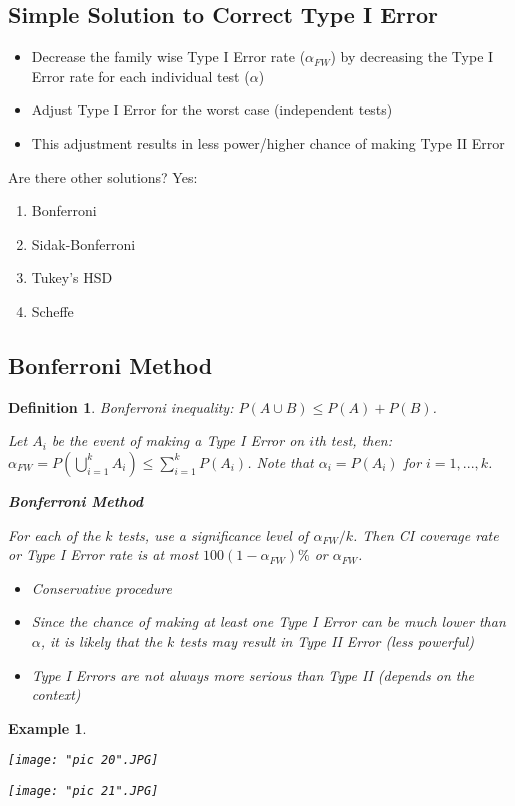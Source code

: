 \documentclass[a4paper,11pt]{article}
\newtheorem{defn}[thm]{Definition}
\newtheorem{eg}[thm]{Example}
\begin{document}
\subsection{Simple Solution to Correct Type I Error}
\begin{itemize}
\item Decrease the family wise Type I Error rate ($\alpha_{FW}$) by decreasing the Type I Error rate for each individual test ($\alpha$)
\item Adjust Type I Error for the worst case (independent tests)
\item This adjustment results in less power/higher chance of making Type II Error
\end{itemize}
Are there other solutions? Yes: 
\begin{enumerate}
\item Bonferroni
\item Sidak-Bonferroni
\item Tukey's HSD
\item Scheffe
\end{enumerate}

\subsection{Bonferroni Method}
\begin{defn}
\normalfont
Bonferroni inequality: $P(A\cup B)\leq P(A)+P(B)$. 

Let $A_i$ be the event of making a Type I Error on $i$th test, then: $\alpha_{FW}=P(\bigcup_{i=1}^k A_i)\leq \sum_{i=1}^k P(A_i)$. Note that $\alpha_i=P(A_i)$ for $i=1,...,k$. 

\textbf{Bonferroni Method}

For each of the $k$ tests, use a significance level of $\alpha_{FW}/k$. Then CI coverage rate or Type I Error rate is at most $100(1-\alpha_{FW})\%$ or $\alpha_{FW}$. 
\begin{itemize}
\item Conservative procedure
\item Since the chance of making at least one Type I Error can be much lower than $\alpha$, it is likely that the $k$ tests may result in Type II Error (less powerful)
\item Type I Errors are not always more serious than Type II (depends on the context)
\end{itemize}
\end{defn}
\begin{eg}
\normalfont
\ 

\begin{center}
	\texttt{[image: "pic 20".JPG]}
\end{center}

\begin{center}
	\texttt{[image: "pic 21".JPG]}
\end{center}

\end{eg}
\end{document}
